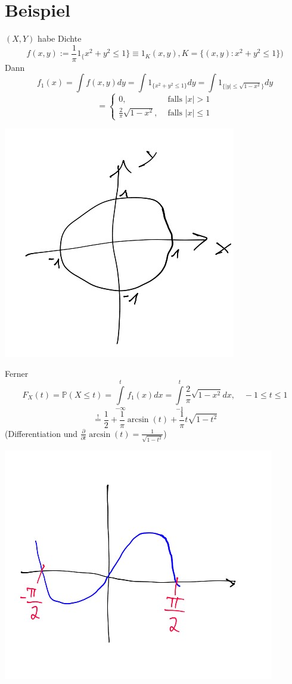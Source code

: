 \documentclass[a4paper,11pt,notitlepage]{report}
\newcommand{\Prim}{{\ensuremath{\mathbb{P}}}}
\begin{document}
\section{Beispiel}
$(X,Y)$ habe Dichte 
$$f(x,y) := \frac{1}{\pi} 1_\{x^2 + y^2 \leq 1\} \equiv 1_K(x,y), K = \{(x,y) \colon x^2 + y^2 \leq 1\} )$$
Dann
$$f_1(x) = \int{f(x,y) dy} = \int 1_{\{x^2 + y^2 \leq 1\}} dy = \int 1_{\{|y| \leq \sqrt{1-x^2}\}} dy$$
$$= \begin{cases} 0, & \text{ falls } |x| > 1 \\ \frac{2}{\pi} \sqrt{1-x^2}, & \text{ falls } |x| \leq 1 \end{cases}$$

\begin{center}
	\includegraphics[scale=0.3]{kreis.jpg}
\end{center}

Ferner
$$F_X(t) = \Prim(X \leq t) = \int\limits_{-\infty}^t{f_1(x) dx} = \int\limits_{-1}^t{\frac{2}{\pi} \sqrt{1-x^2} dx}, \quad -1 \leq t \leq 1$$
$$\overset{!}{=} \frac{1}{2} + \frac{1}{\pi} \arcsin(t) + \frac{1}{\pi} t \sqrt{1-t^2}$$
(Differentiation und $\frac{\partial}{\partial t} \arcsin(t) = \frac{1}{\sqrt{1-t^2}}$)
\begin{center}
	\includegraphics[scale=0.3]{sinus.jpg}
\end{center}
\end{document}
